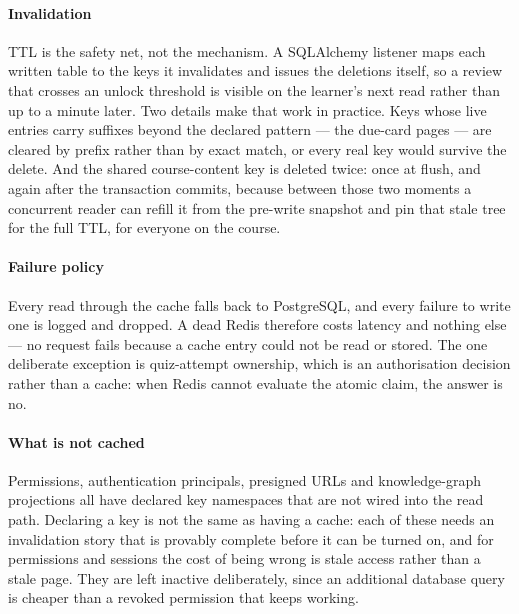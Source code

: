 \paragraph{Invalidation}
TTL is the safety net, not the mechanism. A SQLAlchemy listener maps each written table to the keys it invalidates and issues the deletions itself, so a review that crosses an unlock threshold is visible on the learner's next read rather than up to a minute later. Two details make that work in practice. Keys whose live entries carry suffixes beyond the declared pattern --- the due-card pages --- are cleared by prefix rather than by exact match, or every real key would survive the delete. And the shared course-content key is deleted twice: once at flush, and again after the transaction commits, because between those two moments a concurrent reader can refill it from the pre-write snapshot and pin that stale tree for the full TTL, for everyone on the course.

\paragraph{Failure policy}
Every read through the cache falls back to PostgreSQL, and every failure to write one is logged and dropped. A dead Redis therefore costs latency and nothing else --- no request fails because a cache entry could not be read or stored. The one deliberate exception is quiz-attempt ownership, which is an authorisation decision rather than a cache: when Redis cannot evaluate the atomic claim, the answer is no.

\paragraph{What is not cached}
Permissions, authentication principals, presigned URLs and knowledge-graph projections all have declared key namespaces that are not wired into the read path. Declaring a key is not the same as having a cache: each of these needs an invalidation story that is provably complete before it can be turned on, and for permissions and sessions the cost of being wrong is stale access rather than a stale page. They are left inactive deliberately, since an additional database query is cheaper than a revoked permission that keeps working.
